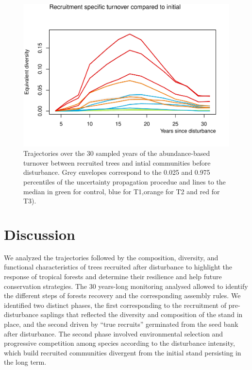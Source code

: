 \documentclass[fleqn,10pt]{ArtEcoFoG} %
\begin{document}
\begin{figure}

{\centering \includegraphics{RecruitmentTrajectories_files/figure-latex/Fig4-1} 

}

\caption{Trajectories over the 30 sampled years of the abundance-based turnover between recruited trees and intial communities before disturbance. Grey envelopes correspond to the 0.025 and 0.975 percentiles of the uncertainty propagation procedue and lines to the median in green for control, blue for T1,orange for T2 and red for T3).}\label{fig:Fig4}
\end{figure}

\section{Discussion}\label{discussion}

We analyzed the trajectories followed by the composition, diversity, and
functional characteristics of trees recruited after disturbance to
highlight the response of tropical forests and determine their
resilience and help future conservation strategies. The 30 years-long
monitoring analysed allowed to identify the different steps of forests
recovery and the corresponding assembly rules. We identified two
distinct phases, the first corresponding to the recruitment of
pre-disturbance saplings that reflected the diversity and composition of
the stand in place, and the second driven by ``true recruits''
germinated from the seed bank after disturbance. The second phase
involved environmental selection and progressive competition among
species according to the disturbance intensity, which build recruited
communities divergent from the initial stand persisting in the long
term.
\end{document}
